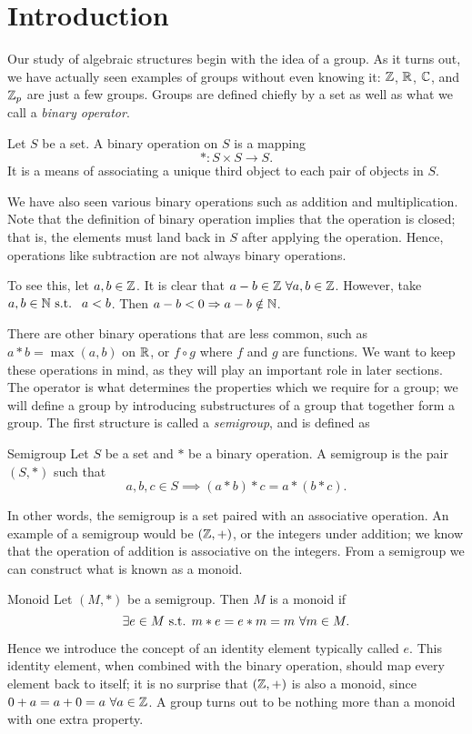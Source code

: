 \section{Introduction}
Our study of algebraic structures begin with the idea of a group.
As it turns out, we have actually seen examples of groups without even knowing it: $\mathbb{Z}$, $\mathbb{R}$, $\mathbb{C}$, and $\mathbb{Z}_{p}$ are just a few groups.
Groups are defined chiefly by a set as well as what we call a \textit{binary operator}.
\begin{definition}{}
	Let $S$ be a set. A binary operation on $S$ is a mapping
	\[*:S\times S \to S.\]
	It is a means of associating a unique third object to each pair of objects in $S$.
\end{definition}
We have also seen various binary operations such as addition and multiplication. Note that the definition of binary operation implies that the operation is closed; that is, the elements must land back in $S$ after applying the operation. Hence, operations like subtraction are not always binary operations.
\begin{example}{}
    To see this, let $a,b\in\mathbb{Z}$. It is clear that $a-b\in\mathbb{Z}\ \forall a,b\in\mathbb{Z}$. However, take $a,b\in\mathbb{N}\text{ s.t. }\ a<b$. Then $a-b<0\Rightarrow a-b\notin \mathbb{N}$.
\end{example}
There are other binary operations that are less common, such as $a*b=\max{(a,b)}$ on $\mathbb{R}$, or $f\circ g$ where $f$ and $g$ are functions. We want to keep these operations in mind, as they will play an important role in later sections.
The operator is what determines the properties which we require for a group; we will define a group by introducing substructures of a group that together form a group.
The first structure is called a \textit{semigroup}, and is defined as
\begin{definition}{Semigroup}
	Let $S$ be a set and $*$ be a binary operation. A semigroup is the pair $(S,*)$ such that
	\[
		a,b,c\in S\implies (a*b)*c=a*(b*c).
	\]
\end{definition}
In other words, the semigroup is a set paired with an associative operation.
An example of a semigroup would be $(\mathbb{Z},+)$, or the integers under addition; we know that the operation of addition is associative on the integers.
From a semigroup we can construct what is known as a monoid.
\begin{definition}{Monoid}
	Let $(M,*)$ be a semigroup. Then $M$ is a monoid if
	\[
		\exists e\in M\text{ s.t. } m*e=e*m=m\ \forall m\in M.
	\]
\end{definition}
Hence we introduce the concept of an identity element typically called $e$.
This identity element, when combined with the binary operation, should map every element back to itself; it is no surprise that $(\mathbb{Z},+)$ is also a monoid, since $0+a=a+0=a\ \forall a\in\mathbb{Z}$.
A group turns out to be nothing more than a monoid with one extra property.

